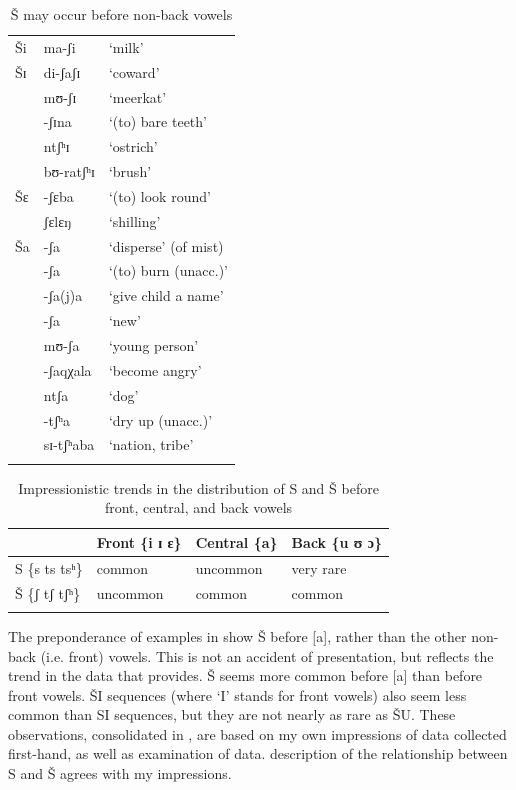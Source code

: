 \documentclass[output=paper,newtxmath,modfonts,nonflat]{langsci/langscibook}
\begin{document}
\begin{table}[p]
\begin{tabularx}{\textwidth}{XXX}
\lsptoprule 
{Ši} & ma-ʃi & {‘milk’} \\ 
\tablevspace
{Šɪ} & di-ʃaʃɪ & {‘coward’} \\
& mʊ-ʃɪ & ‘meerkat’ \\
& -ʃɪna & ‘(to) bare teeth’  \\
& ntʃʰɪ & ‘ostrich’  \\
& bʊ-ratʃʰɪ & ‘brush’ \\ 
\tablevspace
 {Šɛ} & -ʃɛba & {‘(to) look round’} \\
& ʃɛlɛŋ & ‘shilling’ \\ 
\tablevspace
{Ša} &-ʃa & {‘disperse’ (of mist)} \\
& -ʃa & ‘(to) burn (unacc.)’  \\
&-ʃa(j)a & ‘give child a name’ \\ 
&-ʃa & ‘new’ \\ 
&mʊ-ʃa & ‘young person’ \\ 
&-ʃaqχala & ‘become angry’ \\ 
&ntʃa & ‘dog’ \\ 
&-tʃʰa & ‘dry up (unacc.)’ \\ 
&sɪ-tʃʰaba & ‘nation, tribe’ \\
\lspbottomrule
\end{tabularx}
\caption{Š may occur before non-back vowels \citep{Cole1955}}
\label{tab:bennett:7}
\end{table}

\begin{table}[p]
\begin{tabularx}{\textwidth}{XXXX}
\lsptoprule
& Front \{i ɪ ɛ\} & Central \{a\} & Back \{u ʊ ɔ\}\\
\midrule
S \{s ts tsʰ\} & common & uncommon & very rare\\
Š \{ʃ tʃ tʃʰ\} & uncommon & common & common\\
\lspbottomrule
\end{tabularx}
\caption{Impressionistic trends in the distribution of S and Š before front, central, and back vowels}
\label{tab:bennett:8}
\end{table}

The preponderance of examples in  show Š before [a], rather than the other non-back (i.e. front) vowels. This is not an accident of presentation, but reflects the trend in the data that \citet{Cole1955} provides. Š seems more common before [a] than before front vowels. ŠI sequences (where ‘I’ stands for front vowels) also seem less common than SI sequences, but they are not nearly as rare as ŠU. These observations, consolidated in , are based on my own impressions of data collected first-hand, as well as examination of  data.  description of the relationship between S and Š agrees with my impressions.
\end{document}
